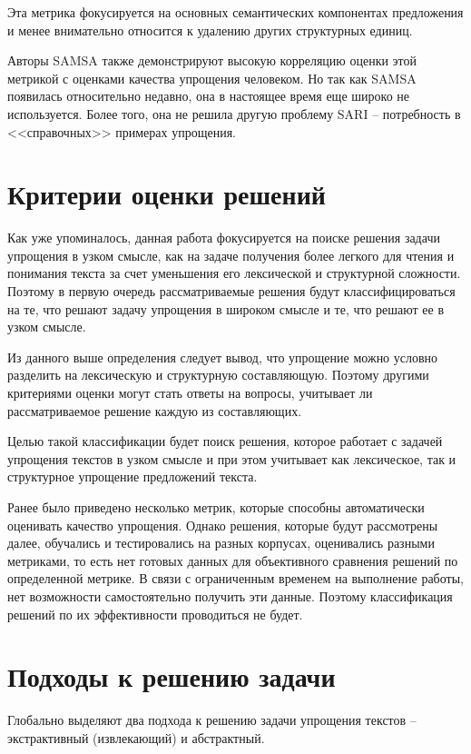Эта метрика фокусируется на основных семантических компонентах предложения и менее внимательно относится к удалению других структурных единиц.

Авторы SAMSA также демонстрируют высокую корреляцию оценки этой метрикой с оценками качества упрощения человеком. Но так как SAMSA появилась относительно недавно, она в настоящее время еще широко не используется. Более того, она не решила другую проблему SARI -- потребность в <<справочных>> примерах упрощения.


\section{Критерии оценки решений}

Как уже упоминалось, данная работа фокусируется на поиске решения задачи упрощения в узком смысле, как на задаче получения более легкого для чтения и понимания текста за счет уменьшения его лексической и структурной сложности\cite{martin_muss_2021}. Поэтому в первую очередь рассматриваемые решения будут классифицироваться на те, что решают задачу упрощения в широком смысле и те, что решают ее в узком смысле.

Из данного выше определения следует вывод, что упрощение можно условно разделить на лексическую и структурную составляющую. Поэтому другими критериями оценки могут стать ответы на вопросы, учитывает ли рассматриваемое решение каждую из составляющих.

Целью такой классификации будет поиск решения, которое работает с задачей упрощения текстов в узком смысле и при этом учитывает как лексическое, так и структурное упрощение предложений текста.

Ранее было приведено несколько метрик, которые способны автоматически оценивать качество упрощения. Однако решения, которые будут рассмотрены далее, обучались и тестировались на разных корпусах, оценивались разными метриками, то есть нет готовых данных для объективного сравнения решений по определенной метрике. В связи с ограниченным временем на выполнение работы, нет возможности самостоятельно получить эти данные. Поэтому классификация решений по их эффективности проводиться не будет.


\section{Подходы к решению задачи}

Глобально выделяют два подхода к решению задачи упрощения текстов -- экстрактивный (извлекающий) и абстрактный.


